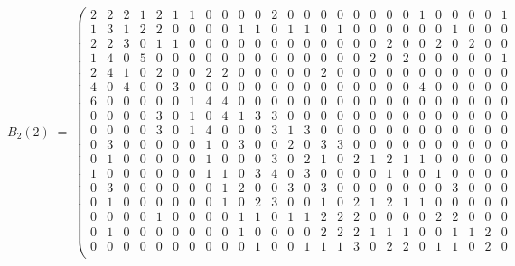 \documentclass[11pt]{amsart}
\theoremstyle{plain}
\theoremstyle{definition}
\begin{document}
	\begingroup\scriptsize\setlength{\arraycolsep}{1.9pt}
	\[ B_2(2)\;=\;\left(\begin{array}{*{26}{r}}
		2 & 2 & 2 & 1 & 2 & 1 & 1 & 0 & 0 & 0 & 0 & 2 & 0 & 0 & 0 & 0 & 0 & 0 & 0 & 0 & 1 & 0 & 0 & 0 & 0 & 1 \\
		1 & 3 & 1 & 2 & 2 & 0 & 0 & 0 & 0 & 1 & 1 & 0 & 1 & 1 & 0 & 1 & 0 & 0 & 0 & 0 & 0 & 0 & 1 & 0 & 0 & 0 \\
		2 & 2 & 3 & 0 & 1 & 1 & 0 & 0 & 0 & 0 & 0 & 0 & 0 & 0 & 0 & 0 & 0 & 0 & 2 & 0 & 0 & 2 & 0 & 2 & 0 & 0 \\
		1 & 4 & 0 & 5 & 0 & 0 & 0 & 0 & 0 & 0 & 0 & 0 & 0 & 0 & 0 & 0 & 0 & 2 & 0 & 2 & 0 & 0 & 0 & 0 & 0 & 1 \\
		2 & 4 & 1 & 0 & 2 & 0 & 0 & 2 & 2 & 0 & 0 & 0 & 0 & 0 & 2 & 0 & 0 & 0 & 0 & 0 & 0 & 0 & 0 & 0 & 0 & 0 \\
		4 & 0 & 4 & 0 & 0 & 3 & 0 & 0 & 0 & 0 & 0 & 0 & 0 & 0 & 0 & 0 & 0 & 0 & 0 & 0 & 4 & 0 & 0 & 0 & 0 & 0 \\
		6 & 0 & 0 & 0 & 0 & 0 & 1 & 4 & 4 & 0 & 0 & 0 & 0 & 0 & 0 & 0 & 0 & 0 & 0 & 0 & 0 & 0 & 0 & 0 & 0 & 0 \\
		0 & 0 & 0 & 0 & 3 & 0 & 1 & 0 & 4 & 1 & 3 & 3 & 0 & 0 & 0 & 0 & 0 & 0 & 0 & 0 & 0 & 0 & 0 & 0 & 0 & 0 \\
		0 & 0 & 0 & 0 & 3 & 0 & 1 & 4 & 0 & 0 & 0 & 3 & 1 & 3 & 0 & 0 & 0 & 0 & 0 & 0 & 0 & 0 & 0 & 0 & 0 & 0 \\
		0 & 3 & 0 & 0 & 0 & 0 & 0 & 1 & 0 & 3 & 0 & 0 & 2 & 0 & 3 & 3 & 0 & 0 & 0 & 0 & 0 & 0 & 0 & 0 & 0 & 0 \\
		0 & 1 & 0 & 0 & 0 & 0 & 0 & 1 & 0 & 0 & 0 & 3 & 0 & 2 & 1 & 0 & 2 & 1 & 2 & 1 & 1 & 0 & 0 & 0 & 0 & 0 \\
		1 & 0 & 0 & 0 & 0 & 0 & 0 & 1 & 1 & 0 & 3 & 4 & 0 & 3 & 0 & 0 & 0 & 0 & 1 & 0 & 0 & 1 & 0 & 0 & 0 & 0 \\
		0 & 3 & 0 & 0 & 0 & 0 & 0 & 0 & 1 & 2 & 0 & 0 & 3 & 0 & 3 & 0 & 0 & 0 & 0 & 0 & 0 & 0 & 3 & 0 & 0 & 0 \\
		0 & 1 & 0 & 0 & 0 & 0 & 0 & 0 & 1 & 0 & 2 & 3 & 0 & 0 & 1 & 0 & 2 & 1 & 2 & 1 & 1 & 0 & 0 & 0 & 0 & 0 \\
		0 & 0 & 0 & 0 & 1 & 0 & 0 & 0 & 0 & 1 & 1 & 0 & 1 & 1 & 2 & 2 & 2 & 0 & 0 & 0 & 0 & 2 & 2 & 0 & 0 & 0 \\
		0 & 1 & 0 & 0 & 0 & 0 & 0 & 0 & 0 & 1 & 0 & 0 & 0 & 0 & 2 & 2 & 2 & 1 & 1 & 1 & 0 & 0 & 1 & 1 & 2 & 0 \\
		0 & 0 & 0 & 0 & 0 & 0 & 0 & 0 & 0 & 0 & 1 & 0 & 0 & 1 & 1 & 1 & 3 & 0 & 2 & 2 & 0 & 1 & 1 & 0 & 2 & 0 \\

\end{array}\]
\end{document}
